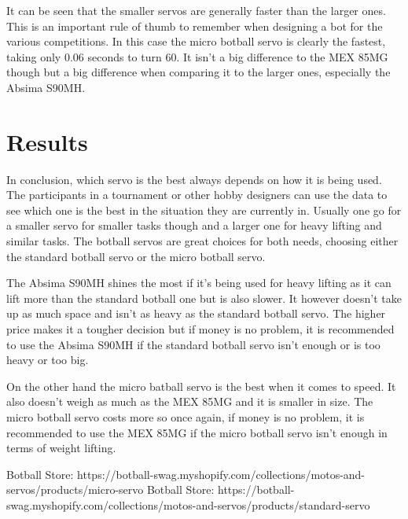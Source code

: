 \documentclass[conference]{IEEEtran}
\begin{document}
It can be seen that the smaller servos are generally faster than the larger ones. This is an important rule of thumb to remember when designing a bot for the various competitions. In this case the micro botball servo is clearly the fastest, taking only 0.06 seconds to turn 60. It isn't a big difference to the MEX 85MG though but a big difference when comparing it to the larger ones, especially the Absima S90MH.

\section{Results}

In conclusion, which servo is the best always depends on how it is being used. The participants in a tournament or other hobby designers can use the data to see which one is the best in the situation they are currently in. Usually one go for a smaller servo for smaller tasks though and a larger one for heavy lifting and similar tasks. The botball servos are great choices for both needs, choosing either the standard botball servo or the micro botball servo. 

The Absima S90MH shines the most if it's being used for heavy lifting as it can lift more than the standard botball one but is also slower. It however doesn't take up as much space and isn't as heavy as the standard botball servo. The higher price makes it a tougher decision but if money is no problem, it is recommended to use the Absima S90MH if the standard botball servo isn't enough or is too heavy or too big.

On the other hand the micro batball servo is the best when it comes to speed. It also doesn't weigh as much as the MEX 85MG and it is smaller in size. The micro botball servo costs more so once again, if money is no problem, it is recommended to use the MEX 85MG if the micro botball servo isn't enough in terms of weight lifting. 

\begin{thebibliography}{00}
 Botball Store: https://botball-swag.myshopify.com/collections/motos-and-servos/products/micro-servo
 Botball Store: https://botball-swag.myshopify.com/collections/motos-and-servos/products/standard-servo
\end{thebibliography}
\end{document}
